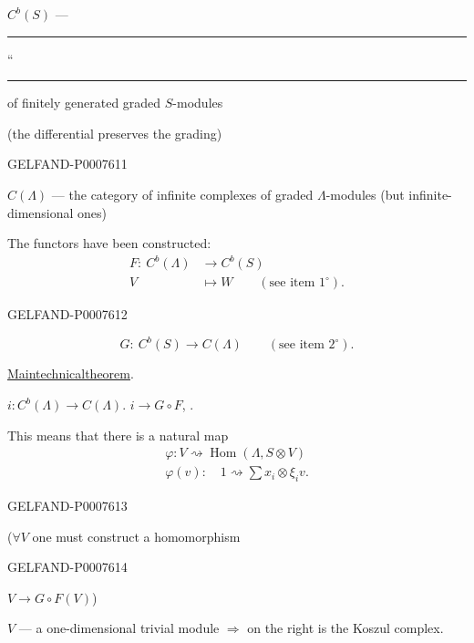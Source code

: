 \(C^b(S)\) --- \rule{1em}{.35pt} “ \rule{1.5em}{.35pt}
of finitely generated graded \(S\)-modules

(the differential preserves the grading)


\begin{GelfandAdjacentEvidence}{GELFAND-P000761}{1}

\(C(\Lambda)\) --- the category of infinite complexes of graded \(\Lambda\)-modules
(but infinite-dimensional ones)

The functors have been constructed:
\begin{align*}
F:\ C^b(\Lambda)&\longrightarrow C^b(S)\\
V&\longmapsto W\qquad(\text{see item }1^\circ).
\end{align*}
\end{GelfandAdjacentEvidence}
\begin{GelfandAdjacentEvidence}{GELFAND-P000761}{2}

\[
G:\ C^b(S)\longrightarrow C(\Lambda)\qquad(\text{see item }2^\circ).
\]

\underline{Main}\quad\underline{technical}\quad\underline{theorem}.

\(i:C^b(\Lambda)\longrightarrow C(\Lambda)\).
\(i\longrightarrow G\circ F\),
.

This means that there is a natural map
\begin{gather*}
\varphi: V\rightsquigarrow\operatorname{Hom}(\Lambda,S\otimes V)\\
\varphi(v):\quad 1\rightsquigarrow\sum x_i\otimes\xi_i v.
\end{gather*}
\end{GelfandAdjacentEvidence}
\begin{GelfandAdjacentEvidence}{GELFAND-P000761}{3}


(\(\forall V\) one must construct a homomorphism
\end{GelfandAdjacentEvidence}
\begin{GelfandAdjacentEvidence}{GELFAND-P000761}{4}

\(V\longrightarrow G\circ F(V)\))

\(V\) --- a one-dimensional trivial module \(\Rightarrow\) on the right is the Koszul complex.

\end{GelfandAdjacentEvidence}
